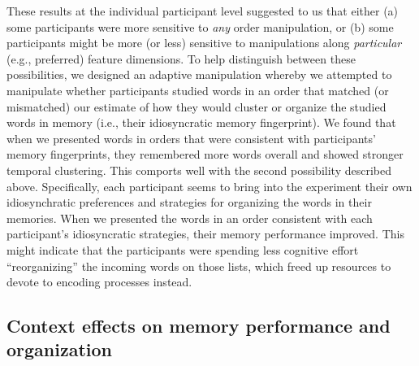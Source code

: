 \documentclass[11pt]{article}
\begin{document}
These results at the individual participant level suggested to us that either
(a) some participants were more sensitive to \textit{any} order manipulation,
or (b) some participants might be more (or less) sensitive to manipulations
along \textit{particular} (e.g., preferred) feature dimensions. To help
distinguish between these possibilities, we designed an adaptive manipulation
whereby we attempted to manipulate whether participants studied words in an
order that matched (or mismatched) our estimate of how they would cluster or
organize the studied words in memory (i.e., their idiosyncratic memory
fingerprint). We found that when we presented words in orders that were
consistent with participants' memory fingerprints, they remembered more words
overall and showed stronger temporal clustering. This comports well with the
second possibility described above. Specifically, each participant seems to
bring into the experiment their own idiosynchratic preferences and strategies
for organizing the words in their memories. When we presented the words in an
order consistent with each participant's idiosyncratic strategies, their memory
performance improved. This might indicate that the participants were spending
less cognitive effort ``reorganizing'' the incoming words on those lists, which
freed up resources to devote to encoding processes instead.


\subsection*{Context effects on memory performance and organization}
\end{document}
